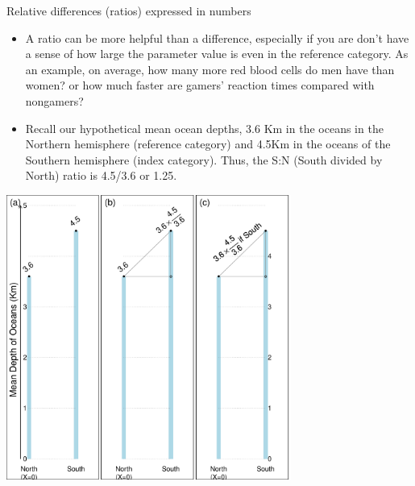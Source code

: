 \documentclass[10pt]{beamer}\usepackage[]{graphicx}\usepackage[]{color}
\newenvironment{knitrout}{}{} %
\begin{document}
\begin{frame}{Relative differences (ratios) expressed in numbers}
	
	\begin{itemize}
		\item A ratio can be more helpful than a difference, especially if you are don't have a sense of how large the parameter value is even in the reference category. As an example, on average, how many more red blood cells do men have than women? or how much faster  are gamers' reaction times compared with nongamers? \pause 
		\item Recall our hypothetical mean ocean depths, 3.6 Km  in the oceans in the Northern hemisphere (reference category) and 4.5Km in the oceans of the Southern hemisphere (index category). Thus, the S:N (South divided by North) ratio is 4.5/3.6 or 1.25.
	\end{itemize}
\end{frame}	
	
	
	\begin{frame}
\begin{knitrout}\tiny
{}\color{fgcolor}

{\centering \includegraphics[width=0.7\textwidth]{figure/unnamed-chunk-3-1} 

}



\end{knitrout}
	\end{frame}
	
\end{document}
